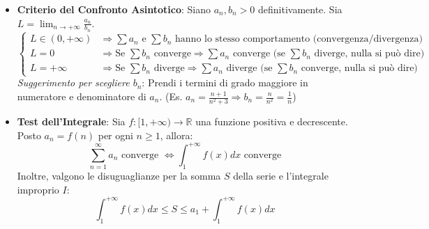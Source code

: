 \documentclass[10pt, a4paper]{article}
\begin{document}
\begin{itemize}
            \item \textbf{Criterio del Confronto Asintotico}:
            Siano $a_n, b_n > 0$ definitivamente. Sia $L = \lim_{n\rightarrow +\infty}\frac{a_n}{b_n}$.
            \begin{equation*}
                \begin{cases}
                    L \in (0,+\infty) & \Rightarrow \sum a_n \text{ e } \sum b_n \text{ hanno lo stesso comportamento (convergenza/divergenza)} \\
                    L = 0 & \Rightarrow \text{Se } \sum b_n \text{ converge} \Rightarrow \sum a_n \text{ converge (se } \sum b_n \text{ diverge, nulla si può dire)} \\
                    L = +\infty & \Rightarrow \text{Se } \sum b_n \text{ diverge} \Rightarrow \sum a_n \text{ diverge (se } \sum b_n \text{ converge, nulla si può dire)}
                \end{cases}
            \end{equation*}
            \textit{Suggerimento per scegliere $b_n$}: Prendi i termini di grado maggiore in numeratore e denominatore di $a_n$. (Es. $a_n=\frac{n+1}{n^2+3} \Rightarrow b_n=\frac{n}{n^2}=\frac{1}{n}$)

            \item \textbf{Test dell'Integrale}:
            Sia $f: [1, +\infty) \to \mathbb{R}$ una funzione positiva e decrescente.
            Posto $a_n = f(n)$ per ogni $n \geq 1$, allora:
            \begin{equation*}
                \sum_{n=1}^{\infty} a_n \text{ converge } \iff \int_{1}^{+\infty} f(x)dx \text{ converge}
            \end{equation*}
            Inoltre, valgono le disuguaglianze per la somma $S$ della serie e l'integrale improprio $I$:
            \begin{equation*}
                \int_{1}^{+\infty} f(x)dx \leq S \leq a_1 + \int_{1}^{+\infty} f(x)dx
            \end{equation*}
        \end{itemize}
\end{document}
